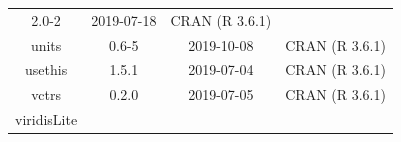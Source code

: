\documentclass[11pt,]{book}
\begin{document}
\begin{longtable}[]{@{}cccc@{}}
\begin{minipage}[t]{0.19\columnwidth}
2.0-2\strut
\end{minipage} & \begin{minipage}[t]{0.16\columnwidth}\centering\strut
2019-07-18\strut
\end{minipage} & \begin{minipage}[t]{0.36\columnwidth}\centering\strut
CRAN (R 3.6.1)\strut
\end{minipage}\tabularnewline
\begin{minipage}[t]{0.18\columnwidth}\centering\strut
units\strut
\end{minipage} & \begin{minipage}[t]{0.19\columnwidth}\centering\strut
0.6-5\strut
\end{minipage} & \begin{minipage}[t]{0.16\columnwidth}\centering\strut
2019-10-08\strut
\end{minipage} & \begin{minipage}[t]{0.36\columnwidth}\centering\strut
CRAN (R 3.6.1)\strut
\end{minipage}\tabularnewline
\begin{minipage}[t]{0.18\columnwidth}\centering\strut
usethis\strut
\end{minipage} & \begin{minipage}[t]{0.19\columnwidth}\centering\strut
1.5.1\strut
\end{minipage} & \begin{minipage}[t]{0.16\columnwidth}\centering\strut
2019-07-04\strut
\end{minipage} & \begin{minipage}[t]{0.36\columnwidth}\centering\strut
CRAN (R 3.6.1)\strut
\end{minipage}\tabularnewline
\begin{minipage}[t]{0.18\columnwidth}\centering\strut
vctrs\strut
\end{minipage} & \begin{minipage}[t]{0.19\columnwidth}\centering\strut
0.2.0\strut
\end{minipage} & \begin{minipage}[t]{0.16\columnwidth}\centering\strut
2019-07-05\strut
\end{minipage} & \begin{minipage}[t]{0.36\columnwidth}\centering\strut
CRAN (R 3.6.1)\strut
\end{minipage}\tabularnewline
\begin{minipage}[t]{0.18\columnwidth}\centering\strut
viridisLite\strut
\end{minipage} & \begin{minipage}[t]{0.19\columnwidth}\centering\strut

\end{minipage}
\end{longtable}
\end{document}
